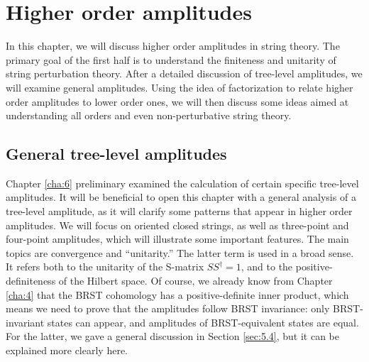 
\chapter{\texorpdfstring{Higher order amplitudes}{9 Higher order amplitudes}} \label{cha:9}
In this chapter, we will discuss higher order amplitudes in string theory. The primary goal of the first half is to understand the finiteness and unitarity of string perturbation theory. After a detailed discussion of tree-level amplitudes, we will examine general amplitudes. 
Using the idea of factorization to relate higher order amplitudes to lower order ones, we will then discuss some ideas aimed at understanding all orders and even non-perturbative string theory.

\section{General tree-level amplitudes} \label{sec:9.1}

Chapter \ref{cha:6} preliminary examined the calculation of certain specific tree-level amplitudes.
It will be beneficial to open this chapter with a general analysis of a tree-level amplitude, as it will clarify some patterns that appear in higher order amplitudes. 
We will focus on oriented closed strings, as well as three-point and four-point amplitudes, which will illustrate some important features. The main topics are convergence and ``unitarity.'' The latter term is used in a broad sense. 
It refers both to the unitarity of the S-matrix $S S^{\dagger}=1$, and to the positive-definiteness of the Hilbert space. Of course, we already know from Chapter \ref{cha:4} that the BRST cohomology has a positive-definite inner product, 
which means we need to prove that the amplitudes follow BRST invariance: only BRST-invariant states can appear, and amplitudes of BRST-equivalent states are equal. 
For the latter, we gave a general discussion in Section \ref{sec:5.4}, but it can be explained more clearly here.

